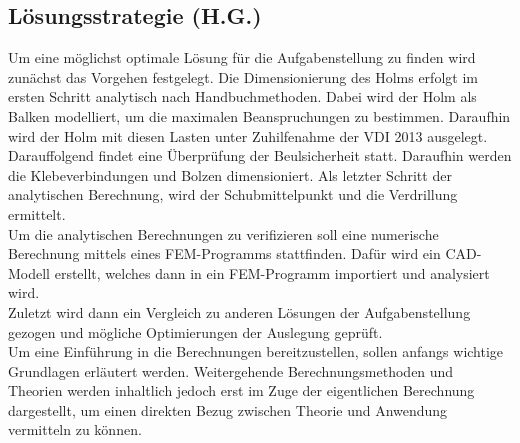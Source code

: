 \subsection{Lösungsstrategie (H.G.)}
Um eine möglichst optimale Lösung für die Aufgabenstellung zu finden wird zunächst das Vorgehen festgelegt. Die Dimensionierung des Holms erfolgt im ersten Schritt analytisch nach Handbuchmethoden. Dabei wird der Holm als Balken modelliert, um die maximalen Beanspruchungen zu bestimmen. Daraufhin wird der Holm mit diesen Lasten unter Zuhilfenahme der VDI 2013 ausgelegt. Darauffolgend findet eine Überprüfung der Beulsicherheit statt. Daraufhin werden die Klebeverbindungen und Bolzen dimensioniert. Als letzter Schritt der analytischen Berechnung, wird der Schubmittelpunkt und die Verdrillung ermittelt.\\
Um die analytischen Berechnungen zu verifizieren soll eine numerische Berechnung mittels eines FEM-Programms stattfinden. Dafür wird ein CAD-Modell erstellt, welches dann in ein FEM-Programm importiert und analysiert wird.\\
Zuletzt wird dann ein Vergleich zu anderen Lösungen der Aufgabenstellung gezogen und mögliche Optimierungen der Auslegung geprüft.\\

\noindent Um eine Einführung in die Berechnungen bereitzustellen, sollen anfangs wichtige Grundlagen erläutert werden. Weitergehende Berechnungsmethoden und Theorien werden inhaltlich jedoch erst im Zuge der eigentlichen Berechnung dargestellt, um einen direkten Bezug zwischen Theorie und Anwendung vermitteln zu können. 
